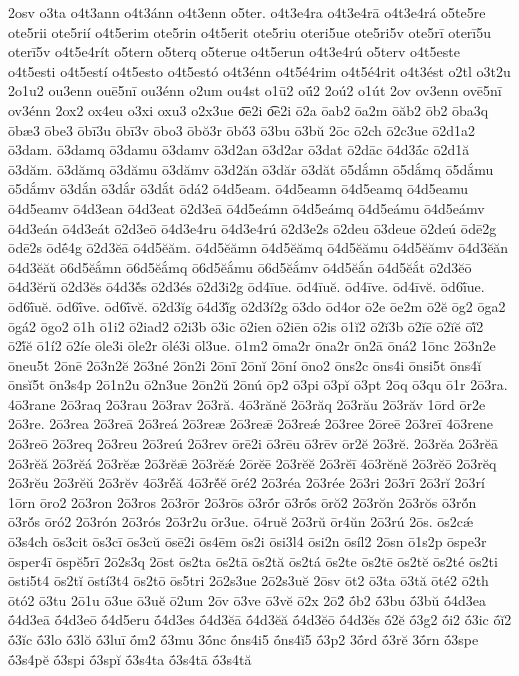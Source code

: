 {2osv
o3ta
o4t3ann
o4t3ánn
o4t3enn
o5ter.
o4t3e4ra
o4t3e4rā
o4t3e4rá
o5te5re
ote5rii
ote5rií
o4t5erim
ote5rin
o4t5erit
ote5riu
oteri5ue
ote5ri5v
ote5rī
oterī5u
oterī5v
o4t5e4rít
o5tern
o5terq
o5terue
o4t5erun
o4t3e4rú
o5terv
o4t5este
o4t5esti
o4t5estí
o4t5esto
o4t5estó
o4t3énn
o4t5é4rim
o4t5é4rit
o4t3ést
o2tl
o3t2u
2o1u2
ou3enn
ouē5nī
ou3énn
o2um
ou4st
o1ū2
oū́2
2oú2
o1út
2ov
ov3enn
ovē5nī
ov3énn
2ox2
ox4eu
o3xi
oxu3
o2x3ue
o͞e2i
o͡e2i
ō2a
ōab2
ōa2m
ōăb2
ōb2
ōba3q
ōbæ3
ōbe3
ōbī3u
ōbī3v
ōbo3
ōbŏ3r
ōbŏ́3
ō3bu
ō3bŭ
2ōc
ō2ch
ō2c3ue
ō2d1a2
ō3dam.
ō3damq
ō3damu
ō3damv
ō3d2an
ō3d2ar
ō3dat
ō2dāc
ō4d3ā́c
ō2d1ă
ō3dăm.
ō3dămq
ō3dămu
ō3dămv
ō3d2ăn
ō3dăr
ō3dăt
ō5dắmn
ō5dắmq
ō5dắmu
ō5dắmv
ō3dắn
ō3dắr
ō3dắt
ōdá2
ō4d5eam.
ō4d5eamn
ō4d5eamq
ō4d5eamu
ō4d5eamv
ō4d3ean
ō4d3eat
ō2d3eā
ō4d5eámn
ō4d5eámq
ō4d5eámu
ō4d5eámv
ō4d3eán
ō4d3eát
ō2d3eō
ō4d3e4ru
ō4d3e4rú
ō2d3e2s
ō2deu
ō3deue
ō2deú
ōdē2g
ōdē2s
ōdḗ4g
ō2d3ĕā
ō4d5ĕăm.
ō4d5ĕămn
ō4d5ĕămq
ō4d5ĕămu
ō4d5ĕămv
ō4d3ĕăn
ō4d3ĕăt
ō6d5ĕắmn
ō6d5ĕắmq
ō6d5ĕắmu
ō6d5ĕắmv
ō4d5ĕắn
ō4d5ĕắt
ō2d3ĕō
ō4d3ĕrŭ
ō2d3ĕs
ō4d3ĕ́s
ō2d3és
ō2d3i2g
ōd4īue.
ōd4īuĕ.
ōd4īve.
ōd4īvĕ.
ōd6ī́ue.
ōd6ī́uĕ.
ōd6ī́ve.
ōd6ī́vĕ.
ō2d3ĭg
ō4d3ĭ́g
ō2d3í2g
ō3do
ōd4or
ō2e
ōe2m
ō2ĕ
ōg2
ōga2
ōgá2
ōgo2
ō1h
ō1i2
ō2iad2
ō2i3b
ō3ic
ō2ien
ō2iēn
ō2is
ō1ĭ2
ō2ĭ3b
ō2ĭē
ō2ĭĕ
ōĭ́2
ō2ĭ́ĕ
ō1í2
ō2íe
ōle3i
ōle2r
ōlé3i
ōl3ue.
ō1m2
ōma2r
ōna2r
ōn2ā
ōná2
1ōnc
2ō3n2e
ōneu5t
2ōnē
2ō3n2ĕ
2ō3né
2ōn2i
2ōnī
2ōnĭ
2ōní
ōno2
ōns2c
ōns4i
ōnsi5t
ōns4ĭ
ōnsĭ5t
ōn3s4p
2ō1n2u
ō2n3ue
2ōn2ŭ
2ōnú
ōp2
ō3pi
ō3pĭ
ō3pt
2ōq
ō3qu
ō1r
2ō3ra.
4ō3rane
2ō3raq
2ō3rau
2ō3rav
2ō3ră.
4ō3rănĕ
2ō3răq
2ō3rău
2ō3răv
1ōrd
ōr2e
2ō3re.
2ō3rea
2ō3reā
2ō3reá
2ō3reæ
2ō3reǣ
2ō3reǽ
2ō3ree
2ōreē
2ō3reī
4ō3rene
2ō3reō
2ō3req
2ō3reu
2ō3reú
2ō3rev
ōrē2i
ō3rēu
ō3rēv
ōr2ĕ
2ō3rĕ.
2ō3rĕa
2ō3rĕā
2ō3rĕă
2ō3rĕá
2ō3rĕæ
2ō3rĕǣ
2ō3rĕǽ
2ōrĕē
2ō3rĕĕ
2ō3rĕī
4ō3rĕnĕ
2ō3rĕō
2ō3rĕq
2ō3rĕu
2ō3rĕŭ
2ō3rĕv
4ō3rĕ́ă
4ō3rĕ́ĕ
ōré2
2ō3réa
2ō3rée
2ō3ri
2ō3rī
2ō3rĭ
2ō3rí
1ōrn
ōro2
2ō3ron
2ō3ros
2ō3rōr
2ō3rōs
ō3rṓr
ō3rṓs
ōrŏ2
2ō3rŏn
2ō3rŏs
ō3rŏ́n
ō3rŏ́s
ōró2
2ō3rón
2ō3rós
2ō3r2u
ōr3ue.
ō4ruĕ
2ō3rŭ
ōr4ŭn
2ō3rú
2ōs.
ōs2cǽ
ō3s4ch
ōs3cit
ōs3cī
ōs3cŭ
ōsē2i
ōs4ēm
ōs2i
ōsi3l4
ōsi2n
ōsíl2
2ōsn
ō1s2p
ōspe3r
ōsper4ī
ōspĕ5rī
2ō2s3q
2ōst
ōs2ta
ōs2tā
ōs2tă
ōs2tá
ōs2te
ōs2tē
ōs2tĕ
ōs2té
ōs2ti
ōsti5t4
ōs2tĭ
ōstí3t4
ōs2tō
ōs5tri
2ō2s3ue
2ō2s3uĕ
2ōsv
ōt2
ō3ta
ō3tă
ōté2
ō2th
ōtó2
ō3tu
2ō1u
ō3ue
ō3uĕ
ō2um
2ōv
ō3ve
ō3vĕ
ō2x
2ō2́
ṓb2
ṓ3bu
ṓ3bŭ
ṓ4d3ea
ṓ4d3eā
ṓ4d3eō
ṓ4d5eru
ṓ4d3es
ṓ4d3ĕā
ṓ4d3ĕă
ṓ4d3ĕō
ṓ4d3ĕs
ṓ2ĕ
ṓ3g2
ṓi2
ṓ3ic
ṓĭ2
ṓ3ĭc
ṓ3lo
ṓ3lŏ
ṓ3luī
ṓm2
ṓ3mu
3ṓnc
ṓns4i5
ṓns4ĭ5
ṓ3p2
3ṓrd
ṓ3rĕ
3ṓrn
ṓ3spe
ṓ3s4pĕ
ṓ3spi
ṓ3spĭ
ṓ3s4ta
ṓ3s4tā
ṓ3s4tă
}
